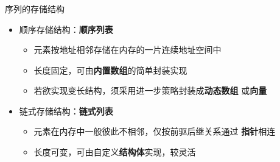 \begin{frame}
    \frametitle{\insertsectionhead}
    \begin{block}{序列的存储结构}
        \begin{itemize}
            \item 顺序存储结构：\textbf{顺序列表}
            \begin{itemize}
                \item 元素按地址相邻存储在内存的一片\alert{连续}地址空间中
                \item 长度\alert{固定}，可由\textbf{内置数组}的简单封装实现
                \item 若欲实现变长结构，须采用进一步策略封装成\textbf{动态数组}
                      或\textbf{向量}
            \end{itemize}
            \item 链式存储结构：\textbf{链式列表}
            \begin{itemize}
                \item 元素在内存中一般彼此\alert{不相邻}，仅按前驱后继关系通过
                      \textbf{指针}相连
                \item 长度\alert{可变}，可由自定义\textbf{结构体}实现，较灵活
            \end{itemize}
        \end{itemize}
    \end{block}
\end{frame}


